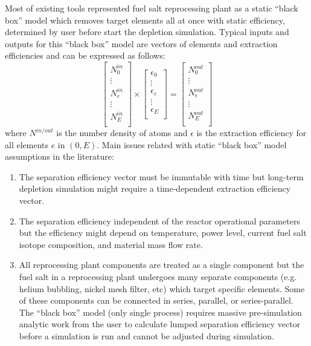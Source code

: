 Most of existing tools represented fuel salt reprocessing plant as a static 
``black box'' model which removes target elements all at once with static 
efficiency, determined by user before start the depletion simulation. 
Typical inputs and outputs for this ``black box'' model are vectors of 
elements and extraction efficiencies and can be expressed as follows:
\begin{equation}
\begin{bmatrix}
N^{in}_{0} \\ \vdots \\ N^{in}_{e} \\ \vdots \\ N^{in}_{E} \\
\end{bmatrix} 
\times
\begin{bmatrix}
\epsilon_{0} \\ \vdots \\ \epsilon_{e} \\ \vdots \\ \epsilon_{E} \\
\end{bmatrix} =
\begin{bmatrix}
N^{out}_{0}\\ \vdots \\ N^{out}_{e} \\ \vdots \\N^{out}_{E}  \\
\end{bmatrix}
\end{equation}
where $N^{in/out}$ is the number density of atoms and $\epsilon$ is the 
extraction efficiency for all elements $e$ in $(0, E)$. Main issues related 
with static ``black box'' model assumptions in the literature: 
\begin{enumerate}
	\item The separation efficiency vector must be immutable with time but  
	long-term depletion simulation might require a time-dependent extraction 
	efficiency vector.
	\item The separation efficiency independent of the reactor operational 
	parameters but the efficiency might depend on temperature, power level, 
	current fuel salt isotope composition, and material mass flow rate.
	\item All reprocessing plant components are treated as a single component 
	but the fuel salt in a reprocessing plant undergoes many separate components 
	(e.g. helium bubbling, nickel mesh filter, etc) which target specific 
	elements. Some of these components can be connected in series, parallel, or 
	series-parallel. The ``black box'' model (only single process) requires 
	massive pre-simulation analytic work from the user to calculate lumped 
	separation 	efficiency vector before a simulation is run and cannot be 
	adjusted during simulation.	
\end{enumerate}

